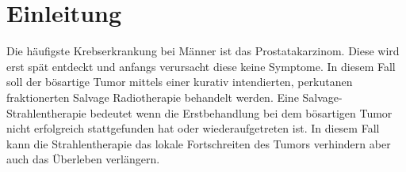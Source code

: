 \section{Einleitung}
\label{sec:Einleitung}
Die häufigste Krebserkrankung bei Männer ist das Prostatakarzinom. Diese wird erst spät entdeckt und anfangs verursacht diese keine Symptome. \cite{Prostata} In diesem Fall soll der bösartige Tumor mittels einer kurativ intendierten, perkutanen fraktionerten Salvage Radiotherapie behandelt werden. Eine Salvage-Strahlentherapie bedeutet wenn die Erstbehandlung bei dem bösartigen Tumor nicht erfolgreich stattgefunden hat oder wiederaufgetreten ist. \cite{Salvage}
In diesem Fall kann die Strahlentherapie das lokale Fortschreiten des Tumors verhindern aber auch das Überleben verlängern. \cite{SRT}